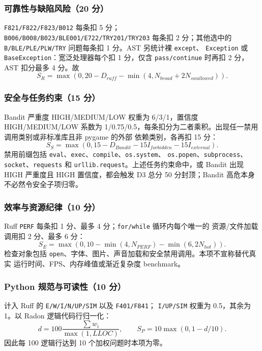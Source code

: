 \documentclass[UTF8,zihao=-4,fontset=fandol]{ctexart}
\begin{document}
\subsubsection{可靠性与缺陷风险（20 分）}

\texttt{F821/F822/F823/B012} 每条扣 5 分；
\texttt{B006/B008/B023/BLE001/E722/TRY201/TRY203} 每条扣 2 分；其他选中的
\texttt{B/BLE/PLE/PLW/TRY} 问题每条扣 1 分。AST 另统计裸 \texttt{except}、
\texttt{Exception} 或 \texttt{BaseException}：宽泛处理器每个扣 1 分，仅含
\texttt{pass/continue} 时再扣 2 分，AST 扣分最多 4 分。故
\[
S_R=\max(0,20-D_{ruff}-\min(4,N_{broad}+2N_{swallowed})).
\]

\subsubsection{安全与任务约束（15 分）}

Bandit 严重度 HIGH/MEDIUM/LOW 权重为 6/3/1，置信度 HIGH/MEDIUM/LOW 系数为
1/0.75/0.5，每条扣分为二者乘积。出现任一禁用调用类别或非标准库且非 pygame 的外部
依赖类别，各再扣 15 分：
\[
S_S=\max(0,15-D_{Bandit}-15I_{forbidden}-15I_{external}).
\]
禁用前缀包括 \texttt{eval}、\texttt{exec}、\texttt{compile}、\texttt{os.system}、
\texttt{os.popen}、\texttt{subprocess}、\texttt{socket}、\texttt{requests} 和
\texttt{urllib.request}。上述任务约束命中，或 Bandit 出现 HIGH
严重度且 HIGH 置信度，都会触发 D3 总分 50 分封顶；Bandit 高危本身不必然令安全子项归零。

\subsubsection{效率与资源纪律（10 分）}

Ruff \texttt{PERF} 每条扣 1 分、最多 4 分；\texttt{for/while} 循环内每个唯一的
资源/文件加载调用扣 2 分、最多 6 分：
\[
S_E=\max(0,10-\min(4,N_{PERF})-\min(6,2N_{hot})).
\]
检查对象包括 \texttt{open}、字体、图片、声音加载和安全禁用调用。本项不宣称替代真实
运行时间、FPS、内存峰值或渐近复杂度 benchmark。

\subsubsection{Python 规范与可读性（10 分）}

计入 Ruff 的 \texttt{E/W/I/N/UP/SIM} 以及 \texttt{F401/F841}；
\texttt{I/UP/SIM} 权重为 0.5，其余为 1。以 Radon 逻辑代码行归一化：
\[
d=100\frac{\sum w_i}{\max(1,LLOC)},\qquad S_P=10\max(0,1-d/10).
\]
因此每 100 逻辑行达到 10 个加权问题时本项为零。
\end{document}
